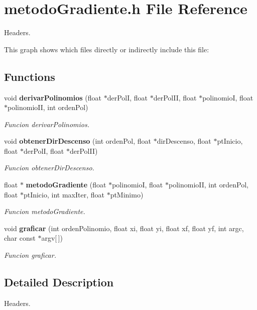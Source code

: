 \section{metodo\+Gradiente.\+h File Reference}
\label{metodo_gradiente_8h}


Headers.  


This graph shows which files directly or indirectly include this file\+:
\subsection*{Functions}
\begin{DoxyCompactItemize}
\item 
void {\bf derivar\+Polinomios} (float $\ast$der\+PolI, float $\ast$der\+Pol\+II, float $\ast$polinomioI, float $\ast$polinomio\+II, int orden\+Pol)
\begin{DoxyCompactList}\small\item\em Funcion derivar\+Polinomios. \end{DoxyCompactList}\item 
void {\bf obtener\+Dir\+Descenso} (int orden\+Pol, float $\ast$dir\+Descenso, float $\ast$pt\+Inicio, float $\ast$der\+PolI, float $\ast$der\+Pol\+II)
\begin{DoxyCompactList}\small\item\em Funcion obtener\+Dir\+Descenso. \end{DoxyCompactList}\item 
float $\ast$ {\bf metodo\+Gradiente} (float $\ast$polinomioI, float $\ast$polinomio\+II, int orden\+Pol, float $\ast$pt\+Inicio, int max\+Iter, float $\ast$pt\+Minimo)
\begin{DoxyCompactList}\small\item\em Funcion metodo\+Gradiente. \end{DoxyCompactList}\item 
void {\bf graficar} (int orden\+Polinomio, float xi, float yi, float xf, float yf, int argc, char const $\ast$argv[$\,$])
\begin{DoxyCompactList}\small\item\em Funcion graficar. \end{DoxyCompactList}\end{DoxyCompactItemize}


\subsection{Detailed Description}
Headers. 


